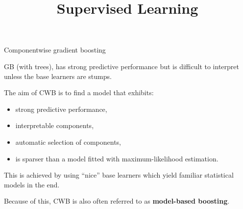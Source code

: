\documentclass[11pt,compress,t,notes=noshow, xcolor=table]{beamer}
\title{Supervised Learning}
\date{}
\begin{document}


\begin{vbframe}{Componentwise gradient boosting}

GB (with trees), has strong predictive
performance but is difficult to interpret unless the base learners are stumps.

\lz

The aim of CWB is to find a model that exhibits:

\begin{itemize}
  \item
    strong predictive performance,

  \item
    interpretable components,

  \item
    automatic selection of components,

  \item
    is sparser than a model fitted with maximum-likelihood estimation.
\end{itemize}

\lz

This is achieved by using \enquote{nice} base learners which yield familiar
statistical models
in the end.

\lz

Because of this, CWB is also often referred to as \textbf{model-based boosting}.

\end{vbframe}

\end{document}
